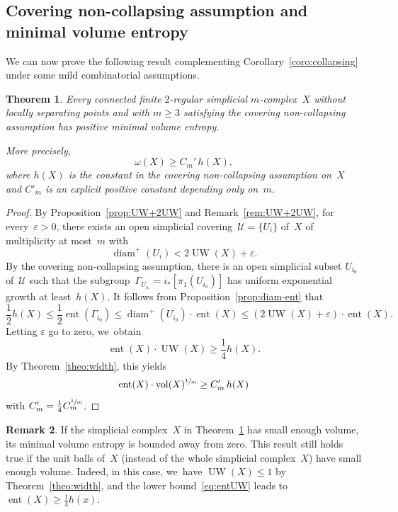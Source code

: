 \documentclass[11pt]{article}
\let\oldsfrac\sfrac
\renewcommand{\sfrac}[2]{{\oldsfrac{#1}{#2}}}
\newtheorem{theorem}{Theorem}[section]
\theoremstyle{definition}
\newtheorem{remark}[theorem]{Remark}
\DeclareMathOperator\diam{diam}
\DeclareMathOperator{\ent}{ent}\let\eent\ent
\DeclareMathOperator{\UW}{UW}
\DeclareMathOperator{\vol}{vol}
\numberwithin{equation}{section}
\begin{document}
\subsection{Covering non-collapsing assumption and minimal volume entropy}

We can now prove the following result complementing Corollary~\ref{coro:collapsing} under some mild combinatorial assumptions.

\begin{theorem} \label{theo:B.bis}
Every connected finite $2$-regular simplicial $m$\nobreakdash-complex~$X$ without locally separating points
and with $m \geq 3$ satisfying the covering non-collapsing assumption has positive minimal volume entropy.

More precisely,
\[
\omega(X) \geq C_m' \, h(X),
\]
where $h(X)$ is the constant in the covering non-collapsing assumption on~$X$ and $C'_m$ is an explicit positive constant depending only on~$m$.
\end{theorem}

\begin{proof}
By Proposition~\ref{prop:UW+2UW} and Remark~\ref{rem:UW+2UW}, for every~$\varepsilon >0$, there exists an open simplicial covering~$\mathcal{U}=\{U_i\}$ of~$X$ of multiplicity at most~$m$ with
\[
\diam^+(U_i) < 2\UW(X) + \varepsilon.
\]
By the covering non-collapsing assumption, there is an open simplicial subset $U_{i_0}$ of~$\mathcal{U}$ such that the subgroup~$\Gamma_{U_{i_0}}=i_*[\pi_1(U_{i_0})]$ has uniform exponential growth at least~$h(X)$.
It follows from Proposition~\ref{prop:diam-ent} that
\[
\frac{1}{2} h(X) \leq \frac{1}{2} \ent(\Gamma_{i_0}) \leq \diam^+(U_{i_0}) \cdot \ent(X) \leq (2 \UW(X) + \varepsilon) \cdot \ent(X).
\]
Letting $\varepsilon$ go to zero, we~obtain
\begin{equation} \label{eq:entUW}
\ent(X) \cdot \UW(X) \geq \frac{1}{4} h(X).
\end{equation}
By Theorem~\ref{theo:width}, this yields
\[
\ent(X) \cdot \vol(X)^{\sfrac{1}{m}} \geq C'_m \, h(X)
\]
with $C'_m = \frac{1}{4} C_m^{\sfrac{1}{m}}$.
\end{proof}

\begin{remark} \label{rem:entUW}
If the simplicial complex~$X$ in Theorem~\ref{theo:B.bis} has small enough volume, its minimal volume entropy is bounded away from zero.
This result still holds true if the unit balls of~$X$ (instead of the whole simplicial complex~$X$) have small enough volume.
Indeed, in this case, we~have $\UW(X) \leq 1$ by Theorem~\ref{theo:width}, and the lower bound~\eqref{eq:entUW} leads to $\ent(X) \geq \frac{1}{4} h(x)$.
\end{remark}
\end{document}
